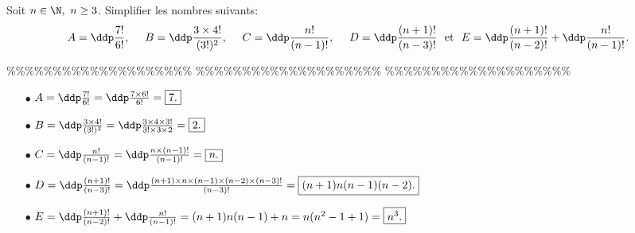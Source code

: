 



\begin{exercice}  \;
\noindent Soit $n\in\N,\ n\geq 3$. Simplifier les nombres suivants:
$$A=\ddp\frac{7!}{6!},\ \ \ \ B=\ddp\frac{3\times 4!}{(3!)^2},\ \ \ \ 
C=\ddp\frac{n!}{(n-1)!},\ \ \ \ D=\ddp\frac{(n+1)!}{(n-3)!}\ \ \hbox{et}\ \ E=\ddp\frac{(n+1)!}{(n-2)!}+\ddp\frac{n!}{(n-1)!}.$$
\end{exercice}


\%\%\%\%\%\%\%\%\%\%\%\%\%\%\%\%\%\%\%\%
\%\%\%\%\%\%\%\%\%\%\%\%\%\%\%\%\%\%\%\%
\%\%\%\%\%\%\%\%\%\%\%\%\%\%\%\%\%\%\%\%




\begin{correction}  \; \vsec
\begin{itemize}
\item[$\bullet$] $A=\ddp\frac{7!}{6!}=\ddp\frac{7\times 6!}{6!}=\fbox{$7.$}$
\item[$\bullet$] $B=\ddp\frac{3\times 4!}{(3!)^2}=\ddp\frac{3\times 4\times 3!}{3!\times 3\times 2}=\fbox{$2$.}$
\item[$\bullet$] $C=\ddp\frac{n!}{(n-1)!}=\ddp\frac{n\times (n-1)!}{(n-1)!}=\fbox{$n$.}$
\item[$\bullet$] $D=\ddp\frac{(n+1)!}{(n-3)!}=\ddp\frac{(n+1)\times n\times (n-1)\times (n-2)\times (n-3)!}{(n-3)!}=\fbox{$(n+1) n (n-1) (n-2)$.}$
\item[$\bullet$] $E=\ddp\frac{(n+1)!}{(n-2)!}+\ddp\frac{n!}{(n-1)!}=(n+1)n(n-1)+n=n(n^2-1+1)=\fbox{$n^3$.}$
\end{itemize}
\end{correction}